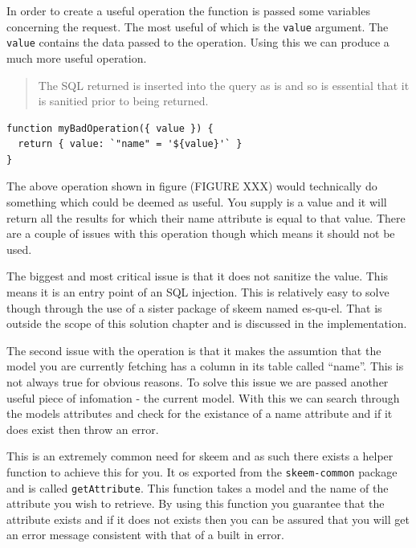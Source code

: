 \documentclass[
  12pt,
]{article}
\newcommand{\passthrough}[1]{#1}
\begin{document}
In order to create a useful operation the function is passed some
variables concerning the request. The most useful of which is the
\passthrough{\lstinline!value!} argument. The
\passthrough{\lstinline!value!} contains the data passed to the
operation. Using this we can produce a much more useful operation.

\begin{quote}
The SQL returned is inserted into the query as is and so is essential
that it is sanitied prior to being returned.
\end{quote}

\begin{lstlisting}[caption={Returns all the records for which the name matches the value supplied. However there are major issues with this and should not be used.}]
function myBadOperation({ value }) {
  return { value: `"name" = '${value}'` }
}
\end{lstlisting}

The above operation shown in figure (FIGURE XXX) would technically do
something which could be deemed as useful. You supply is a value and it
will return all the results for which their name attribute is equal to
that value. There are a couple of issues with this operation though
which means it should not be used.

The biggest and most critical issue is that it does not sanitize the
value. This means it is an entry point of an SQL injection. This is
relatively easy to solve though through the use of a sister package of
skeem named es-qu-el. That is outside the scope of this solution chapter
and is discussed in the implementation.

The second issue with the operation is that it makes the assumtion that
the model you are currently fetching has a column in its table called
``name''. This is not always true for obvious reasons. To solve this
issue we are passed another useful piece of infomation - the current
model. With this we can search through the models attributes and check
for the existance of a name attribute and if it does exist then throw an
error.

This is an extremely common need for skeem and as such there exists a
helper function to achieve this for you. It os exported from the
\passthrough{\lstinline!skeem-common!} package and is called
\passthrough{\lstinline!getAttribute!}. This function takes a model and
the name of the attribute you wish to retrieve. By using this function
you guarantee that the attribute exists and if it does not exists then
you can be assured that you will get an error message consistent with
that of a built in error.
\end{document}
